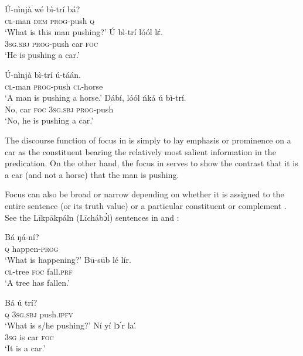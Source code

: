 \documentclass[output=paper,colorlinks,citecolor=brown]{langscibook}
\begin{document}
\ea%
    \label{ex:bisilki:4}
    \ea\label{ex:bisilki:4a}
    \gll    Ú-nìnjà	wé	bì-trí		bá?\\
            \textsc{cl-}man	\textsc{dem}	\textsc{prog-}push	\textsc{q}\\
    \glt    ‘What is this man pushing?’
    \ex\label{ex:bisilki:4b}
    \gll    Ú		bì-trí		lóól	lέ.\\
            \textsc{3sg.sbj}	\textsc{prog-}push	car	\textsc{foc}\\
    \glt    ‘He is pushing a car.’
    \z
\z

\ea%
    \label{ex:bisilki:5}
    \ea\label{ex:bisilki:5a}
    \gll    Ú-nìnjà	bì-trí		ú-táán.\\
            \textsc{cl-}man	\textsc{prog-}push	\textsc{cl-}horse\\
    \glt    ‘A man is pushing a horse.’
    \ex\label{ex:bisilki:5b}
    \gll    Dábí,	lóól	ńká	ú		bì-trí.\\
            No,	car	\textsc{foc}	\textsc{3sg.sbj}	\textsc{prog-}push\\
    \glt    ‘No, he is pushing a car.’
    \z
\z

The discourse function of focus in  is simply to lay emphasis or prominence on a car as the constituent bearing the relatively most salient information in the predication. On the other hand, the focus in  serves to show the contrast that it is a car (and not a horse) that the man is pushing.

Focus can also be broad or narrow depending on whether it is assigned to the entire sentence (or its truth value) or a particular constituent or complement \citep[44]{Dik1981}. See the Līkpākpáln (Līchábͻ́l) sentences in  and :

\ea%
    \label{ex:bisilki:6}
    \ea\label{ex:bisilki:6a}
    \gll    Bá	ŋá-ní?\\
            \textsc{q}	happen\textsc{-prog}\\
    \glt    ‘What is happening?’
    \ex\label{ex:bisilki:6b}
    \gll    Bū-sūb	lé	lír.\\
            \textsc{cl-}tree		\textsc{foc}	fall\textsc{.prf}\\
    \glt    ‘A tree has fallen.’
    \z
\z

\ea%
    \label{ex:bisilki:7}
    \ea\label{ex:bisilki:7a}
    \gll    Bá	ú		trí?\\
            \textsc{q}	\textsc{3sg.sbj}	push\textsc{.ipfv}\\
    \glt    ‘What is s/he pushing?’
    \ex\label{ex:bisilki:7b}
    \gll    Ní	yí	lↄ՛r	la.́\\
            \textsc{3sg}	is	car	\textsc{foc}\\
    \glt    ‘It is a car.’
    \z
\z
\end{document}
